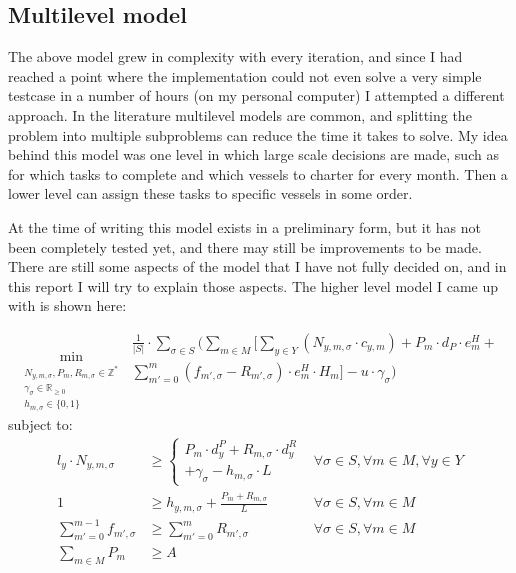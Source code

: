 \documentclass[a4paper,12pt]{article}
\begin{document}
\subsection{Multilevel model}
The above model grew in complexity with every iteration, and since I had reached a point where the implementation could not even solve a very simple testcase in a number of hours (on my personal computer) I attempted a different approach. In the literature multilevel models are common, and splitting the problem into multiple subproblems can reduce the time it takes to solve. My idea behind this model was one level in which large scale decisions are made, such as for which tasks to complete and which vessels to charter for every month. Then a lower level can assign these tasks to specific vessels in some order. 

At the time of writing this model exists in a preliminary form, but it has not been completely tested yet, and there may still be improvements to be made. There are still some aspects of the model that I have not fully decided on, and in this report I will try to explain those aspects. The higher level model I came up with is shown here:

\begin{equation}
	\min_{\substack{N_{y,m,\sigma}, P_m, R_{m,\sigma} \in \mathbb{Z}^* \\
	\gamma_\sigma \in \mathbb{R}_{\geq 0} \\
	h_{m,\sigma} \in \{0, 1\} }}
	\begin{aligned}
	\frac{1}{|S|} \cdot \sum_{\sigma \in S} ( \sum_{m \in M} [\sum_{y \in Y} 
	(N_{y,m,\sigma} \cdot c_{y,m}) +  
	P_m \cdot d_P \cdot e^H_m + \\
	\sum_{m' = 0}^{m} (f_{m',\sigma} - R_{m',\sigma}) \cdot e^H_m \cdot H_m ]
	- u \cdot \gamma_\sigma)
	\end{aligned}	
\end{equation}
subject to:
\begin{align}
l_y \cdot N_{y,m,\sigma} 			&\geq 	\begin{cases} P_m \cdot d^P_y + R_{m,\sigma} \cdot d^R_y \\
								+ \gamma_\sigma - h_{m,\sigma} \cdot L \end{cases}
																				& \forall \sigma \in S, \forall m \in M, \forall y \in Y 	\\
1 						&\geq		h_{y,m,\sigma} + \frac{P_m + R_{m,\sigma}}{L}					& \forall \sigma \in S, \forall m \in M 		 	\\
\sum_{m' = 0}^{m-1} f_{m',\sigma}	&\geq 	\sum_{m' = 0}^m R_{m',\sigma}								& \forall \sigma \in S, \forall m \in M			\\
\sum_{m\in M} P_m 			&\geq 	A 												&						
\end{align}
\end{document}
